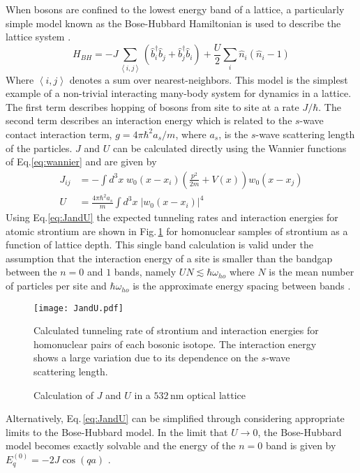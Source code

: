 When bosons are confined to the lowest energy band of a lattice, a particularly simple model known as the Bose-Hubbard Hamiltonian is used to describe the lattice system \hl{\cite{Jaksch1998}}. 
	\begin{equation} \label{eq:boseHubbard}
		 H_{BH} = -J \sum_{\left< i,j \right>} \left(\hat{b}^{\dagger}_i \hat{b}_j + \hat{b}^{\dagger}_j \hat{b}_i \right)
		 		  + \frac{U}{2} \sum_i \hat{n}_i(\hat{n}_i - 1)
	\end{equation}
Where $\left< i,j \right>$ denotes a sum over nearest-neighbors. This model is the simplest example of a non-trivial interacting many-body system for dynamics in a lattice.
The first term describes hopping of bosons from site to site at a rate $J/ \hbar$. 
The second term describes an interaction energy which is related to the $s$-wave contact interaction term, $g = 4 \pi \hbar^2 a_s/m$, where $a_s$, is the $s$-wave scattering length of the particles. 
$J$ and $U$ can be calculated directly using the Wannier functions of Eq.\;\ref{eq:wannier} and are given by \hl{\cite{Jaksch2005}}
	\begin{equation} \label{eq:JandU}
	\begin{aligned}
		 J_{ij} &= - \int d^3x \; w_0(x-x_i) \left( \frac{p^2}{2m}+V(x) \right) w_0(x-x_j)\\
		 U &= \frac{4 \pi \hbar^2 a_s}{m} \int d^3x \; \left| w_0(x-x_i)\right|^4
	\end{aligned}
	\end{equation}
Using Eq.\;\ref{eq:JandU} the expected tunneling rates and interaction energies for atomic strontium are shown in Fig.\,\ref{fig:fig_JandU} for homonuclear samples of strontium as a function of lattice depth. 
This single band calculation is valid under the assumption that the interaction energy of a site is smaller than the bandgap between the $n= 0$ and $1$ bands, namely $U N \lesssim \hbar \omega_{ho}$ where $N$ is the mean number of particles per site and $\hbar \omega_{ho}$ is the approximate energy spacing between bands \hl{\cite{Rey2004}}. 
	\begin{figure}
		\centerline{
		\texttt{[image: JandU.pdf]}}
		\caption{Calculation of $J$ and $U$ in a $532$\,nm optical lattice}{Calculated tunneling rate of strontium and interaction energies for homonuclear pairs of each bosonic isotope. The interaction energy shows a large variation due to its dependence on the $s$-wave scattering length.}
		\label{fig:fig_JandU}
	\end{figure}
Alternatively, Eq.\,\ref{eq:JandU} can be simplified through considering appropriate limits to the Bose-Hubbard model. In the limit that $U\!\rightarrow\!0$, the Bose-Hubbard model becomes exactly solvable and the energy of the $n=0$ band is given by $E_q^{(0)}=-2J \cos(q a)$ \hl{\cite{Jaksch2005}}.
